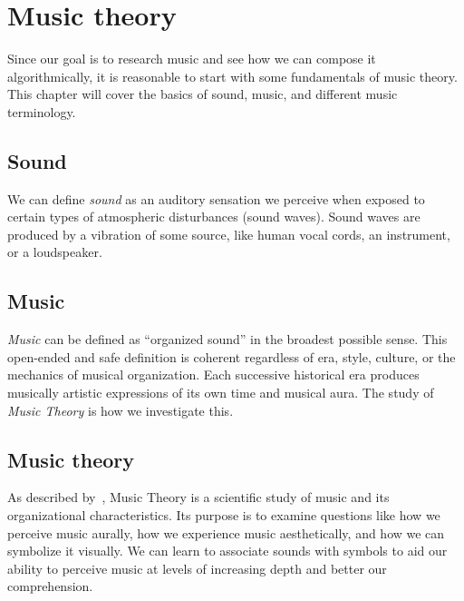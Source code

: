 \chapter{Music theory}\label{ch:music-theory}

\begin{chapterabstract}
    Since our goal is to research music and see how we can compose it algorithmically, it is reasonable to start with some fundamentals of music theory.
    This chapter will cover the basics of sound, music, and different music terminology.
\end{chapterabstract}


\section{Sound}\label{sec:sound}

We can define \textit{sound} as an auditory sensation we perceive when exposed to certain types of atmospheric disturbances (sound waves).
Sound waves are produced by a vibration of some source, like human vocal cords, an instrument, or a loudspeaker.~\cite{sound}


\section{Music}\label{sec:music}

\textit{Music} can be defined as ``organized sound'' in the broadest possible sense.
This open-ended and safe definition is coherent regardless of era, style, culture, or the mechanics of musical organization.
Each successive historical era produces musically artistic expressions of its own time and musical aura.
The study of \textit{Music Theory} is how we investigate this.~\cite{music-theory-andrew}


\section{Music theory}\label{sec:music-theory}

As described by~\cite{music-theory-andrew}, Music Theory is a scientific study of music and its organizational characteristics.
Its purpose is to examine questions like how we perceive music aurally, how we experience music aesthetically, and how we can symbolize it visually.
We can learn to associate sounds with symbols to aid our ability to perceive music at levels of increasing depth and better our comprehension.

